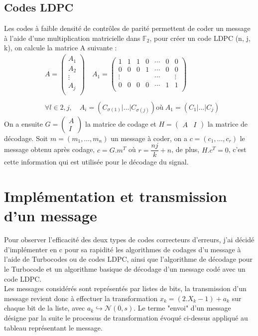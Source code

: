 \documentclass[12pt]{article}
\begin{document}
\subsection{Codes LDPC}
Les codes \`a faible densit\'e de contr\^oles de parit\'e permettent de coder un message \`a l'aide d'une multiplication matricielle dans $\mathbb{F}_2$, pour cr\'eer un code LDPC (n, j, k), on calcule la matrice A suivante :
\begin{equation*}
	\begin{split}
	& A =
	\begin{pmatrix}
	A_1 \\
	A_2 \\
	\vdots \\
	A_j	\\ \end{pmatrix} \quad
	A_1 =
	\begin{pmatrix}
	1 & 1 & 1 & 0 & \cdots & 0 & 0 \\
	0 & 0 & 0 & 1 & \cdots & 0 & 0 \\
	\vdots & & & & \cdots & & \vdots \\ 
	0 & 0 & 0 & 0 & \cdots & 1 & 1 \\ \end{pmatrix}\\ & \\
	& \forall l \in {2, j}, \quad A_i = \left(C_{\sigma(1)}|\ldots|C_{\sigma(j)}\right) \text{o\`u} \; A_1 = \left(C_1|\ldots|C_j\right)
	\end{split}
\end{equation*}
On a ensuite $G = \begin{pmatrix} A \\ I \end{pmatrix}$ la matrice de codage et $H = \begin{pmatrix} A & I \end{pmatrix}$ la matrice de d\'ecodage. Soit $m = (m_1, \ldots, m_n)$  un message \`a coder, on a $c = (c_1,\ldots,c_r)$ le message obtenu apr\`es codage, $c = G.m^T$  o\`u $r = \dfrac{nj}{k} + n$, de plus, $H.c^T = 0$, c'est cette information qui est utilis\'ee pour le d\'ecodage du signal.


\section{Impl\'ementation et transmission d'un message}
Pour observer l'efficacit\'e des deux types de codes correcteurs d'erreurs, j'ai d\'ecid\'e d'impl\'ementer en c pour sa rapidit\'e les algorithmes de codages d'u message \`a l'aide de Turbocodes ou de codes LDPC, ainsi que l'algorithme de d\'ecodage pour le Turbocode et un algorithme basique de d\'ecodage d'un message cod\'e avec un code LDPC.\\
Les messages consid\'er\'es sont repr\'esent\'es par listes de bits, la transmission d'un message revient donc \`a effectuer la transformation $x_k = (2.X_k - 1) + a_k$ sur chaque bit de la liste, avec $a_k \hookrightarrow \mathcal{N}(0, s)$. Le terme "envoi" d'un message d\'esigne par la suite le processus de transformation \'evoqu\'e ci-dessus appliqu\'e au tableau repr\'esentant le message.
\end{document}
